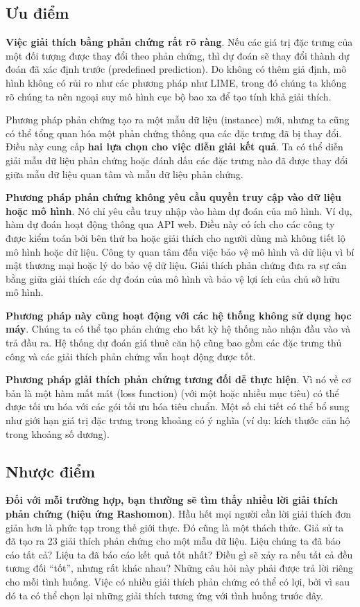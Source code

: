 \subsection{Ưu điểm}
\textbf{Việc giải thích bằng phản chứng rất rõ ràng}. Nếu các giá trị đặc trưng của một đối tượng được thay đổi theo phản chứng, thì dự đoán sẽ thay đổi thành dự đoán đã xác định trước (predefined prediction). Do không có thêm giả định, mô hình không có rủi ro như các phương pháp như LIME, trong đó chúng ta không rõ chúng ta nên ngoại suy mô hình cục bộ bao xa để tạo tính khả giải thích.

Phương pháp phản chứng tạo ra một mẫu dữ liệu (instance) mới, nhưng ta cũng có thể tổng quan hóa một phản chứng thông qua các đặc trưng đã bị thay đổi. Điều này cung cấp \textbf{hai lựa chọn cho việc diễn giải kết quả}. Ta có thể diễn giải mẫu dữ liệu phản chứng hoặc đánh dấu các đặc trưng nào đã được thay đổi giữa mẫu dữ liệu quan tâm và mẫu dữ liệu phản chứng.

\textbf{Phương pháp phản chứng không yêu cầu quyền truy cập vào dữ liệu hoặc mô hình}. Nó chỉ yêu cầu truy nhập vào hàm dự đoán của mô hình. Ví dụ, hàm dự đoán hoạt động thông qua API web. Điều này có ích cho các công ty được kiểm toán bởi bên thứ ba hoặc giải thích cho người dùng mà không tiết lộ mô hình hoặc dữ liệu. Công ty quan tâm đến việc bảo vệ mô hình và dữ liệu vì bí mật thương mại hoặc lý do bảo vệ dữ liệu. Giải thích phản chứng đưa ra sự cân bằng giữa giải thích các dự đoán của mô hình và bảo vệ lợi ích của chủ sỡ hữu mô hình.

\textbf{Phương pháp này cũng hoạt động với các hệ thống không sử dụng học máy}. Chúng ta có thể tạo phản chứng cho bất kỳ hệ thống nào nhận đầu vào và trả đầu ra. Hệ thống dự đoán giá thuê căn hộ cũng bao gồm các đặc trưng thủ công và các giải thích phản chứng vẫn hoạt động được tốt.

\textbf{Phương pháp giải thích phản chứng tương đối dễ thực hiện}. Vì nó về cơ bản là một hàm mất mát (loss function) (với một hoặc nhiều mục tiêu) có thể được tối ưu hóa với các gói tối ưu hóa tiêu chuẩn. Một số chi tiết có thể bổ sung như giới hạn giá trị đặc trưng trong khoảng có ý nghĩa (ví dụ: kích thước căn hộ trong khoảng số dương).

\subsection{Nhược điểm}
\textbf{Đối với mỗi trường hợp, bạn thường sẽ tìm thấy nhiều lời giải thích phản chứng (hiệu ứng Rashomon)}. Hầu hết mọi người cần lời giải thích đơn giản hơn là phức tạp trong thế giới thực. Đó cũng là một thách thức. Giả sử ta đã tạo ra 23 giải thích phản chứng cho một mẫu dữ liệu. Liệu chúng ta đã báo cáo tất cả? Liệu ta đã báo cáo kết quả tốt nhất? Điều gì sẽ xảy ra nếu tất cả đều tương đối ``tốt'', nhưng rất khác nhau? Những câu hỏi này phải được trả lời riêng cho mỗi tình huống. Việc có nhiều giải thích phản chứng có thể có lợi, bởi vì sau đó ta có thể chọn lại những giải thích tương ứng với tình huống trước đây.

